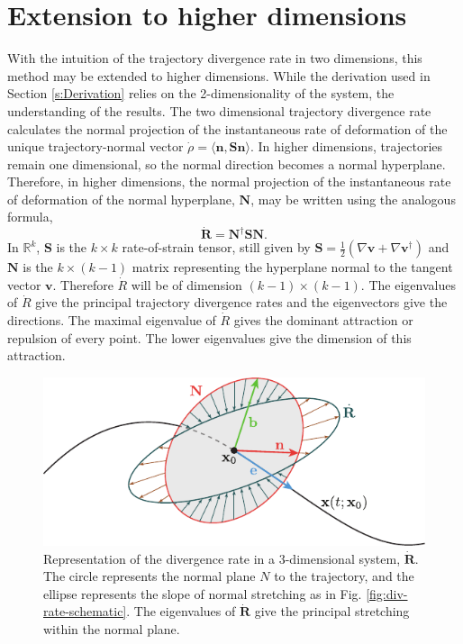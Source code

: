 \documentclass[twocolumn]{svjour3}
\begin{document}
\section{Extension to higher dimensions}\label{s:HigherDimension}
With the intuition of the trajectory divergence rate in two dimensions, this method may be extended to higher dimensions. While the derivation used in Section \ref{s:Derivation} relies on the 2-dimensionality of the system, the understanding of the results. The two dimensional trajectory divergence rate calculates the normal projection of the instantaneous rate of deformation of the unique trajectory-normal vector $\dot{\rho} = \langle \mathbf{n}, \mathbf{S}\mathbf{n}\rangle$. In higher dimensions, trajectories remain one dimensional, so the normal direction becomes a normal hyperplane. Therefore, in higher dimensions, the normal projection of the instantaneous rate of deformation of the normal hyperplane, $\mathbf{N}$, may be written using the analogous formula,
\begin{equation}\label{eq:higherdim-reprate}
\dot{\mathbf{R}} = \mathbf{N}^\dagger \mathbf{S}\mathbf{N}.
\end{equation}
In $\mathbb{R}^k$, $\mathbf{S}$ is the $k\times k$ rate-of-strain tensor, still given by $\mathbf{S}=\tfrac{1}{2}\left(\nabla \mathbf{v}+\nabla \mathbf{v}^\dagger\right)$ and $\mathbf{N}$ is the $k \times (k-1)$ matrix representing the hyperplane normal to the tangent vector $\mathbf{v}$. Therefore $\dot{R}$ will be of dimension $(k-1) \times (k-1)$. The eigenvalues of $\dot{R}$ give the principal trajectory divergence rates and the eigenvectors give the directions. The maximal eigenvalue of $\dot{R}$ gives the dominant attraction or repulsion of every point. The lower eigenvalues give the dimension of this attraction.

\begin{figure}
\centering
\includegraphics[width=5in]{Fig18}
\caption{Representation of the divergence rate in a 3-dimensional system, $\dot{\textbf{R}}$. The circle represents the normal plane $N$ to the trajectory, and the ellipse represents the slope of normal stretching as in Fig. \ref{fig:div-rate-schematic}. The eigenvalues of $\dot{\mathbf{R}}$ give the principal stretching within the normal plane.}
\label{fig:3dDivRateSchematic}
\end{figure}
\end{document}
